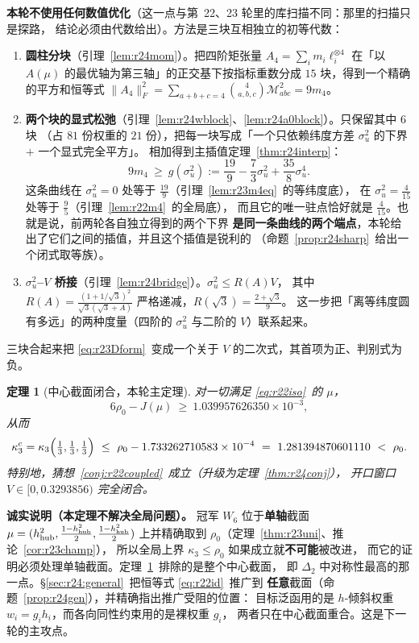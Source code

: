 \documentclass[UTF8,11pt]{ctexart}
\newtheorem{theorem}{定理}[section]
\theoremstyle{definition}
\begin{document}
\textbf{本轮不使用任何数值优化}（这一点与第~22、23 轮里的库扫描不同：那里的扫描只是探路，
结论必须由代数给出）。方法是三块互相独立的初等代数：

\begin{enumerate}\itemsep3pt
\item \textbf{圆柱分块}（引理~\ref{lem:r24mom}）。把四阶矩张量
$A_4=\sum_im_i\ell_i^{\otimes4}$ 在「以 $A(\mu)$ 的最优轴为第三轴」的正交基下按指标重数分成
$15$ 块，得到一个精确的平方和恒等式 $\|A_4\|_F^2=\sum_{a+b+c=4}\binom{4}{a,b,c}\mathcal{M}_{abc}^2=9m_4$。
\item \textbf{两个块的显式松弛}（引理~\ref{lem:r24wblock}、\ref{lem:r24a0block}）。只保留其中 $6$ 块
（占 $81$ 份权重的 $21$ 份），把每一块写成「一个只依赖纬度方差 $\sigma_u^2$ 的下界 $+$ 一个显式完全平方」。
相加得到主插值定理~\ref{thm:r24interp}：
\[
9m_4\ \ge\ g(\sigma_u^2):=\frac{19}9-\frac73\sigma_u^2+\frac{35}8\sigma_u^4 .
\]
这条曲线在 $\sigma_u^2=0$ 处等于 $\frac{19}9$（引理~\ref{lem:r23m4eq}~的等纬度底），
在 $\sigma_u^2=\frac4{15}$ 处等于 $\frac95$（引理~\ref{lem:r22m4}~的全局底），
而且它的唯一驻点恰好就是 $\frac4{15}$。也就是说，前两轮各自独立得到的两个下界
\textbf{是同一条曲线的两个端点}，本轮给出了它们之间的插值，并且这个插值是锐利的
（命题~\ref{prop:r24sharp}~给出一个闭式取等族）。
\item \textbf{$\sigma_u^2$--$V$ 桥接}（引理~\ref{lem:r24bridge}）。$\sigma_u^2\le R(A)V$，
其中 $R(A)=\frac{(1+1/\sqrt3)^2}{\sqrt3(\sqrt3+A)}$ 严格递减，$R(\sqrt3)=\frac{2+\sqrt3}9$。
这一步把「离等纬度圆有多远」的两种度量（四阶的 $\sigma_u^2$ 与二阶的 $V$）联系起来。
\end{enumerate}

三块合起来把 \eqref{eq:r23Dform}~变成一个关于 $V$ 的二次式，其首项为正、判别式为负。

\begin{theorem}[中心截面闭合，本轮主定理]\label{thm:r24main}
对一切满足 \eqref{eq:r22iso}~的 $\mu$，
\[
6\rho_0-J(\mu)\ \ge\ 1.039957626350\times10^{-3},
\]
从而
\begin{equation}\label{eq:r24main}
\kappa_3^c=\kappa_3\Bigl(\tfrac13,\tfrac13,\tfrac13\Bigr)\ \le\ \rho_0-1.733262710583\times10^{-4}
\ =\ 1.281394870601110\ <\ \rho_0 .
\end{equation}
特别地，猜想~\ref{conj:r22coupled}~成立（升级为定理~\ref{thm:r24conj}），
开口窗口 $V\in[0,0.3293856)$ 完全闭合。
\end{theorem}

\textbf{诚实说明（本定理不解决全局问题）。}
冠军 $W_6$ 位于\textbf{单轴}截面 $\mu=(h_{\rm hub}^2,\frac{1-h_{\rm hub}^2}2,\frac{1-h_{\rm hub}^2}2)$
上并精确取到 $\rho_0$（定理~\ref{thm:r23uni}、推论~\ref{cor:r23champ}），
所以全局上界 $\kappa_3\le\rho_0$ 如果成立就\textbf{不可能}被改进，
而它的证明必须处理单轴截面。定理~\ref{thm:r24main}~排除的是整个中心截面，
即 $\Delta_2$ 中对称性最高的那一点。\S\ref{sec:r24:general}~把恒等式 \eqref{eq:r22id}~推广到
\textbf{任意}截面（命题~\ref{prop:r24gen}），并精确指出推广受阻的位置：
目标泛函用的是 $h$-倾斜权重 $w_i=g_ih_i$，而各向同性约束用的是裸权重 $g_i$，
两者只在中心截面重合。这是下一轮的主攻点。
\end{document}
